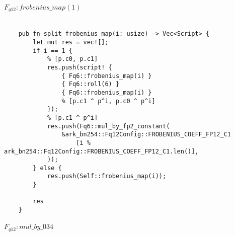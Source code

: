 \paragraph*{$F_{q12} : frobenius\_map(1)$}

\begin{lstlisting}

    pub fn split_frobenius_map(i: usize) -> Vec<Script> {
        let mut res = vec![];
        if i == 1 {
            % [p.c0, p.c1]
            res.push(script! {
                { Fq6::frobenius_map(i) }
                { Fq6::roll(6) }
                { Fq6::frobenius_map(i) }
                % [p.c1 ^ p^i, p.c0 ^ p^i]
            });
            % [p.c1 ^ p^i]
            res.push(Fq6::mul_by_fp2_constant(
                &ark_bn254::Fq12Config::FROBENIUS_COEFF_FP12_C1
                    [i % ark_bn254::Fq12Config::FROBENIUS_COEFF_FP12_C1.len()],
            ));
        } else {
            res.push(Self::frobenius_map(i));
        }

        res
    }
\end{lstlisting}

\paragraph*{$F_{q12}: mul\_by\_034$}

